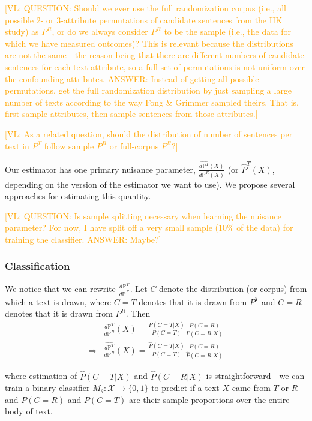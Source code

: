 \documentclass{article}
\newcommand{\vl}[1]{\textcolor{orange}{[VL: #1]}}
\begin{document}
\vl{QUESTION: Should we ever use the full randomization corpus (i.e., all possible 2- or 3-attribute permutations of candidate sentences from the HK study) as $P^R$, or do we always consider $P^R$ to be the sample (i.e., the data for which we have measured outcomes)? This is relevant because the distributions are not the same---the reason being that there are different numbers of candidate sentences for each text attribute, so a full set of permutations is not uniform over the confounding attributes. 
ANSWER: Instead of getting all possible permutations, get the full randomization distribution by just sampling a large number of texts according to the way Fong \& Grimmer sampled theirs. That is, first sample attributes, then sample sentences from those attributes.}

\vl{As a related question, should the distribution of number of sentences per text in $P^T$ follow sample $P^R$ or full-corpus $P^R$?}

Our estimator has one primary nuisance parameter, $\frac{\hat{d\mathbb{P}^T}(X)}{d\mathbb{P}^R(X)}$ (or $\hat{P}^T(X)$, depending on the version of the estimator we want to use). We propose several approaches for estimating this quantity.

\vl{QUESTION: Is sample splitting necessary when learning the nuisance parameter? For now, I have split off a very small sample (10\% of the data) for training the classifier.
ANSWER: Maybe?}

\subsubsection{Classification}
\label{sec:classification}

We notice that we can rewrite $\frac{d\mathbb{P}^T}{d\mathbb{P}^R}$. Let $C$ denote the distribution (or corpus) from which a text is drawn, where $C=T$ denotes that it is drawn from $P^T$ and $C=R$ denotes that it is drawn from $P^R$. Then
\begin{equation*}
    \begin{split}
        &\frac{d\mathbb{P}^T}{d\mathbb{P}^R}(X) = \frac{P(C=T|X)}{P(C=T)}\frac{P(C=R)}{P(C=R|X)}\\
        \Rightarrow &\frac{\hat{d\mathbb{P}^T}}{d\mathbb{P}^R}(X) = \frac{\hat{P}(C=T|X)}{P(C=T)}\frac{P(C=R)}{\hat{P}(C=R|X)}
    \end{split}
\end{equation*}

where estimation of $\hat{P}(C=T|X)$ and $\hat{P}(C=R|X)$ is straightforward---we can train a binary classifier $M_\theta: \mathcal{X} \rightarrow \{0,1\}$ to predict if a text $X$ came from $T$ or $R$---and $P(C=R)$ and $P(C=T)$ are their sample proportions over the entire body of text.
\end{document}
